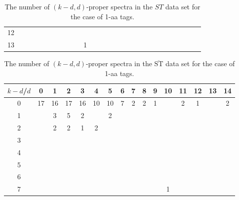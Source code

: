 \documentclass{article}[12pt]
\def\STbar{{\overline{\mathrm{ST}}}}
\begin{document}
\begin{landscape}
\begin{table}[h]
{\begin{tabular}{|c|c|
c|c|c|c|c|c|c|c|c|c|c|c|c|c|c|c|c|c|c|c|c|c|c|c|c|}
12  &  &  &  &  &  &  &  &  &  &  &  &  &  &  &  &  &  &  &  &  &  &  &  &  &  & \\

13  &  &  &  &  &  &  &  &  &  & 1 &  &  &  &  &  &  &  &  &  &  &  &  &  &  &  & \\

  \hline
\end{tabular}
\par}
\centering
\caption{The number of $(k-d,d)$-proper spectra in the $ST$ data set for the case of 1-aa tags.}
\vspace{3mm}
\label{table:kd-1-proper-ST}
\end{table}
\end{landscape}
\begin{landscape}

\begin{table}[h]\footnotesize
{\centering
\begin{tabular}{|c|c|
c|c|c|c|c|c|c|c|c|c|c|c|c|c|}
  \hline
  $k-d$/$d$ 
 & 0 & 1 & 2 & 3 & 4 & 5 & 6 & 7 & 8 & 9 & 10 & 11 & 12 & 13 & 14\\

  \hline
  \hline

0  & 17 & 16 & 17 & 16 & 10 & 10 & 7 & 2 & 2 & 1 &  & 2 & 1 &  & 2\\

1  &  & 3 & 5 & 2 &  & 2 &  &  &  &  &  &  &  &  & \\

2  &  & 2 & 2 & 1 & 2 &  &  &  &  &  &  &  &  &  & \\

3  &  &  &  &  &  &  &  &  &  &  &  &  &  &  & \\

4  &  &  &  &  &  &  &  &  &  &  &  &  &  &  & \\

5  &  &  &  &  &  &  &  &  &  &  &  &  &  &  & \\

6  &  &  &  &  &  &  &  &  &  &  &  &  &  &  & \\

7  &  &  &  &  &  &  &  &  &  &  & 1 &  &  &  & \\

  \hline
\end{tabular}
\par}
\centering
\caption{The number of $(k-d,d)$-proper spectra in the $\STbar$ data set for the case of 1-aa tags.}
\vspace{3mm}
\label{table:kd-1-proper-ST-bar}
\end{table}
\end{landscape}
\end{document}
